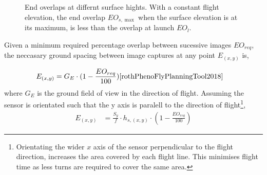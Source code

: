 \documentclass[11pt]{article}
\begin{document}
\begin{figure}[hbt]
    \caption{End overlaps at differnt surface hights. With a constant flight elevation, the end overlap $EO_{s,\max}$ when the surface elevation is at its maximum, is less than the overlap at launch $EO_l$.}
    \label{fig:EndOverlap}
  \end{figure}

\noindent
Given a minimum required percentage overlap between sucessive images $EO_{req}$, the neccasary ground spacing between image captures at any point $E_{(x,y)}$ is,

\begin{align}
    E_{(x,y)} &= G_E \cdot (1-\frac{EO_{req}}{100}) \cite{rothPhenoFlyPlanningTool2018}
\end{align}
\noindent
where $G_E$ is the ground field of view in the direction of flight. Assuming the sensor is orientated such that the y axis is paralell to the direction of flight\footnote{Orientating the wider $x$ axis of the sensor perpendicular to the flight direction, increases the area covered by each flight line. This minimises flight time as less turns are required to cover the same area.}, 
\begin{align}
    E_{(x,y)} &= \frac{S_y}{f} \cdot h_{s,(x,y)} \cdot (1-\frac{EO_{req}}{100})
\end{align}
\end{document}

